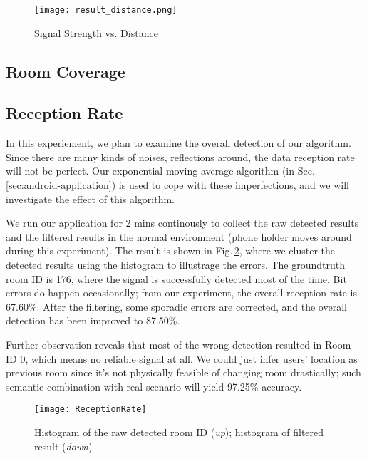 \begin{figure}
  \centering
  \texttt{[image: result\_distance.png]}
  \caption{Signal Strength vs. Distance}
  \vspace{-0.3cm}
  \label{fig:strength}
\end{figure}

\subsection{Room Coverage}
\label{sec:room-coverage}

\subsection{Reception Rate}
\label{sec:reception-rate}
In this experiement, we plan to examine the overall detection of our algorithm. Since there are many kinds of noises, reflections around, the data reception rate will not be perfect. Our exponential moving average algorithm (in Sec.\,\ref{sec:android-application}) is used to cope with these imperfections, and we will investigate the effect of this algorithm.

We run our application for 2 mins continously to collect the raw detected results and the filtered results in the normal environment (phone holder moves around during this experiment). The result is shown in Fig.\,\ref{fig:reception}, where we cluster the detected results using the histogram to illustrage the errors. The groundtruth room ID is 176, where the signal is successfully detected most of the time. Bit errors do happen occasionally; from our experiment, the overall reception rate is 67.60\%. After the filtering, some sporadic errors are corrected, and the overall detection has been improved to 87.50\%. 

Further observation reveals that most of the wrong detection resulted in Room ID 0, which means no reliable signal at all. We could just infer users' location as previous room since it's not physically feasible of changing room drastically; such semantic combination with real scenario will yield 97.25\% accuracy.

\begin{figure}
  \centering
  \texttt{[image: ReceptionRate]}
  \caption{Histogram of the raw detected room ID ({\em up}); histogram of filtered result ({\em down})}
  \vspace{-0.3cm}
  \label{fig:reception}
\end{figure}


